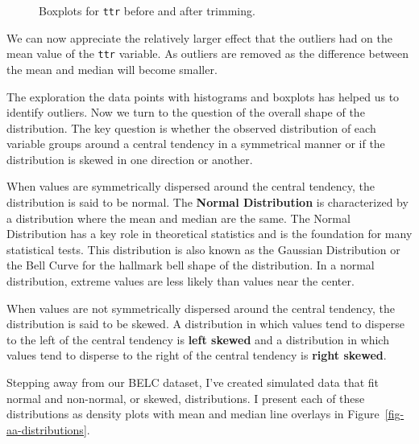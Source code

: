 \documentclass[
  letterpaper,
]{latex/krantz}
\theoremstyle{definition}
\theoremstyle{remark}
\begin{document}
\begin{figure}[H]
\begin{minipage}{0.50\linewidth}
{}


\end{minipage}%

\caption{\label{fig-aa-belc-boxplot-trimmed}Boxplots for \texttt{ttr}
before and after trimming.}

\end{figure}%

We can now appreciate the relatively larger effect that the outliers had
on the mean value of the \texttt{ttr} variable. As outliers are removed
as the difference between the mean and median will become smaller.

The exploration the data points with histograms and boxplots has helped
us to identify outliers. Now we turn to the question of the overall
shape of the distribution. The key question is whether the observed
distribution of each variable groups around a central tendency in a
symmetrical manner or if the distribution is skewed in one direction or
another.

When values are symmetrically dispersed around the central tendency, the
distribution is said to be normal. The \textbf{Normal Distribution} is
characterized by a distribution where the mean and median are the same.
The Normal Distribution has a key role in theoretical statistics and is
the foundation for many statistical tests. This distribution is also
known as the Gaussian Distribution or the Bell Curve for the hallmark
bell shape of the distribution. In a normal distribution, extreme values
are less likely than values near the center.

When values are not symmetrically dispersed around the central tendency,
the distribution is said to be skewed. A distribution in which values
tend to disperse to the left of the central tendency is \textbf{left
skewed} and a distribution in which values tend to disperse to the right
of the central tendency is \textbf{right skewed}.

Stepping away from our BELC dataset, I've created simulated data that
fit normal and non-normal, or skewed, distributions. I present each of
these distributions as density plots with mean and median line overlays
in Figure~\ref{fig-aa-distributions}.
\end{document}
